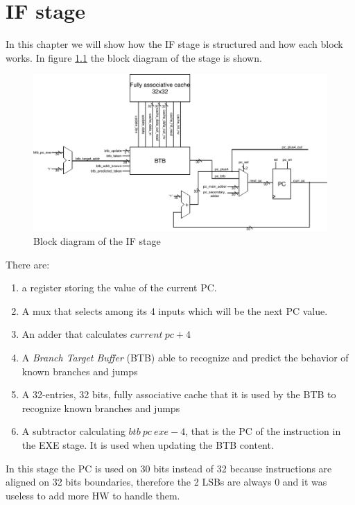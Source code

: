 \chapter{IF stage}
\label{chap:if}

In this chapter we will show how the IF stage is structured and how each block works.
In figure \ref{fig:IF_stage} the block diagram of the stage is shown.

\begin{figure}[!ht]
	\centering
	\includegraphics[width=\linewidth]{./chapters/figures/IF_stage.pdf}
	\caption{Block diagram of the IF stage}
	\label{fig:IF_stage}
\end{figure}

There are:

\begin{enumerate}
    \item a register storing the value of the current PC.
    \item A mux that selects among its 4 inputs which will be the next PC value.
    \item An adder that calculates $current\ pc + 4$
    \item A {\it Branch Target Buffer} (BTB) able to recognize and predict the behavior of known branches and jumps
    \item A 32-entries, 32 bits, fully associative cache that it is used by the BTB to recognize known branches and jumps
    \item A subtractor calculating $btb\ pc\ exe - 4$, that is the PC of the instruction in the EXE stage. It is used when updating the BTB content.
\end{enumerate}

In this stage the PC is used on 30 bits instead of 32 because instructions are aligned on 32 bits boundaries, therefore the 2 LSBs are always 0
and it was useless to add more HW to handle them.


